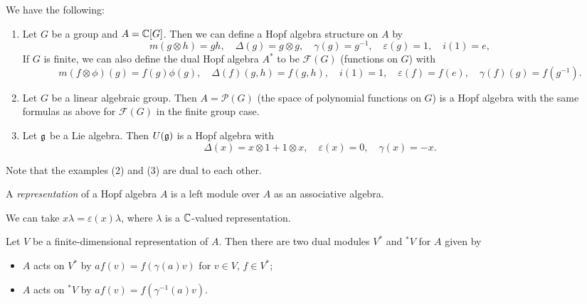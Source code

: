 \begin{example}
  We have the following:
  \begin{enumerate}
    \item Let $G$ be a group and
      $A = \mathbb{C}[G]$. Then we can define
      a Hopf algebra structure on $A$ by
      \[
        m(g \otimes h) = gh, \quad
        \Delta(g) = g \otimes g, \quad
        \gamma(g) = g^{-1}, \quad
        \varepsilon(g) = 1, \quad
        i(1) = e,
      \]
      If $G$ is finite, we can also define
      the dual Hopf algebra $A^*$ to be
      $\mathcal{F}(G)$ (functions on $G$) with
      \[
        m(f \otimes \phi)(g)
        = f(g)\phi(g), \quad
        \Delta(f)(g, h) = f(g, h), \quad
        i(1) = 1, \quad
        \varepsilon(f) = f(e),
        \quad \gamma(f)(g) = f(g^{-1}).
      \]
    \item Let $G$ be a linear algebraic group.
      Then $A = \mathcal{P}(G)$ (the space of polynomial
      functions on $G$) is a Hopf algebra
      with the same formulas as above
      for $\mathcal{F}(G)$ in the finite
      group case.
    \item Let $\mathfrak{g}$ be a Lie algebra. Then
      $U(\mathfrak{g})$ is a Hopf algebra with
      \[
        \Delta(x) = x \otimes 1 + 1 \otimes x, \quad
        \varepsilon(x) = 0, \quad
        \gamma(x) = -x.
      \]
  \end{enumerate}
  Note that the examples (2) and (3) are dual
  to each other.
\end{example}

\begin{definition}
  A \emph{representation} of a Hopf algebra
  $A$ is a left module over $A$ as an
  associative algebra.
\end{definition}

\begin{example}
  We can take $x \lambda = \varepsilon(x) \lambda$,
  where $\lambda$ is a $\mathbb{C}$-valued representation.
\end{example}

\begin{remark}
  Let $V$ be a finite-dimensional representation
  of $A$. Then there are two dual modules
  $V^*$ and ${}^*V$ for $A$ given by
  \begin{itemize}
    \item $A$ acts on $V^*$ by
      $a f(v) = f(\gamma(a) v)$ for
      $v \in V$, $f \in V^*$;
    \item $A$ acts on ${}^* V$ by
      $a f(v) = f(\gamma^{-1}(a) v)$.
  \end{itemize}
\end{remark}

